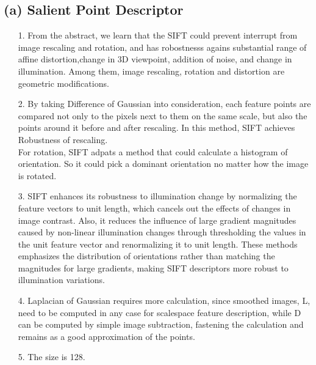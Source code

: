 \documentclass[12pt]{article}
\begin{document}
		\subsection*{(a) Salient Point Descriptor}
		\begin{itemize}
			\item[1.] From the abstract, we learn that the SIFT could prevent interrupt from image rescaling and rotation, and has robostnesss agains substantial range of affine distortion,change in 3D viewpoint, addition of noise, and change in illumination. Among them, image rescaling, rotation and distortion are geometric modifications.
			
			\item[2.] By taking Difference of Gaussian into consideration, each feature points are compared not only to the pixels next to them on the same scale, but also the points around it before and after rescaling. In this method, SIFT achieves Robustness of rescaling. \\
			For rotation, SIFT adpats a method that could calculate a histogram of orientation. So it could pick a dominant orientation no matter how the image is rotated. 
			
			\item[3.] SIFT enhances its robustness to illumination change by normalizing the feature vectors to unit length, which cancels out the effects of changes in image contrast.  Also, it reduces the influence of large gradient magnitudes caused by non-linear illumination changes through thresholding the values in the unit feature vector and renormalizing it to unit length. These methods emphasizes the distribution of orientations rather than matching the magnitudes for large gradients, making SIFT descriptors more robust to illumination variations.
			
			\item[4.] Laplacian of Gaussian requires more calculation, since smoothed images, L, need to be computed in any case for scalespace feature description, while D can be computed by simple image subtraction, fastening the calculation and remains as a good approximation of the points.
			
			\item[5.] The size is 128.
		
		\end{itemize}
			
\end{document}
